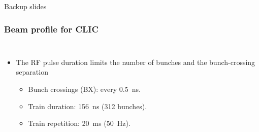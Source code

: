 \begin{frame}

  \centering
  \Huge{Backup slides}

\end{frame}

\begin{frame}
  \frametitle{Beam profile for CLIC}
  
 \begin{columns}

   \begin{itemize}
   \item The RF pulse duration limits the number of bunches and the bunch-crossing separation
     \begin{itemize}
     \item Bunch crossings (BX): every 0.5~ns.
     \item Train duration: 156~ns (312 bunches).
     \item Train repetition: 20~ms (50~Hz).
     \end{itemize}
   \end{itemize}

 \end{columns}
 

\end{frame}

